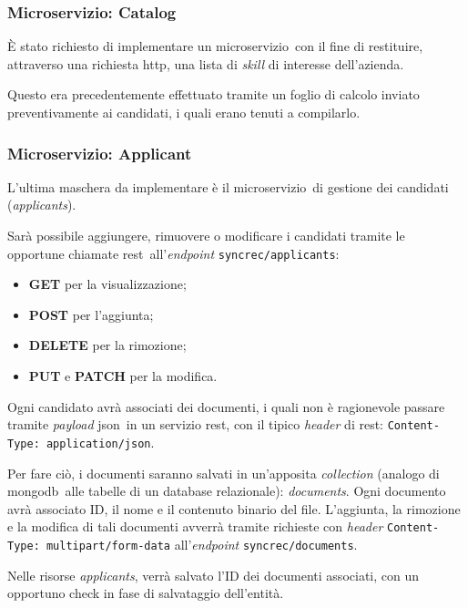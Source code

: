 \subsubsection{Microservizio: Catalog}

È stato richiesto di implementare un \gls{microservizio}\gloss\ con il fine di restituire,
attraverso una richiesta \acrshort{http}\gloss, una lista di \textit{skill} di interesse dell'azienda.

Questo era precedentemente effettuato tramite un foglio di calcolo inviato preventivamente ai candidati, i quali erano tenuti a compilarlo.

\subsubsection{Microservizio: Applicant}

L'ultima maschera da implementare è il \gls{microservizio}\gloss\ di gestione dei candidati (\textit{applicants}).

Sarà possibile aggiungere, rimuovere o modificare i candidati tramite
le opportune chiamate \acrshort{rest}\gloss\ all'\textit{endpoint} \texttt{syncrec/applicants}:
\begin{itemize}
	\item \textbf{GET} per la visualizzazione;
	\item \textbf{POST} per l'aggiunta;
	\item \textbf{DELETE} per la rimozione;
	\item \textbf{PUT} e \textbf{PATCH} per la modifica.
\end{itemize}

Ogni candidato avrà associati dei documenti, i quali non è ragionevole passare tramite \textit{payload} \acrshort{json}\gloss\ in un servizio \acrshort{rest}\gloss, con il tipico \textit{header} di \acrshort{rest}\gloss: \texttt{Content-Type: application/json}.

Per fare ciò, i documenti saranno salvati in un'apposita \textit{collection} (analogo di \gls{mongodb}\gloss\ alle tabelle di un database relazionale):
\textit{documents}.
Ogni documento avrà associato ID, il nome e il contenuto binario del file.
L'aggiunta, la rimozione e la modifica di tali documenti avverrà tramite richieste con \textit{header} \texttt{Content-Type: multipart/form-data}
all'\textit{endpoint} \texttt{syncrec/documents}.

Nelle risorse \textit{applicants}, verrà salvato l'ID dei documenti associati, con un opportuno check in fase di salvataggio dell'entità.

